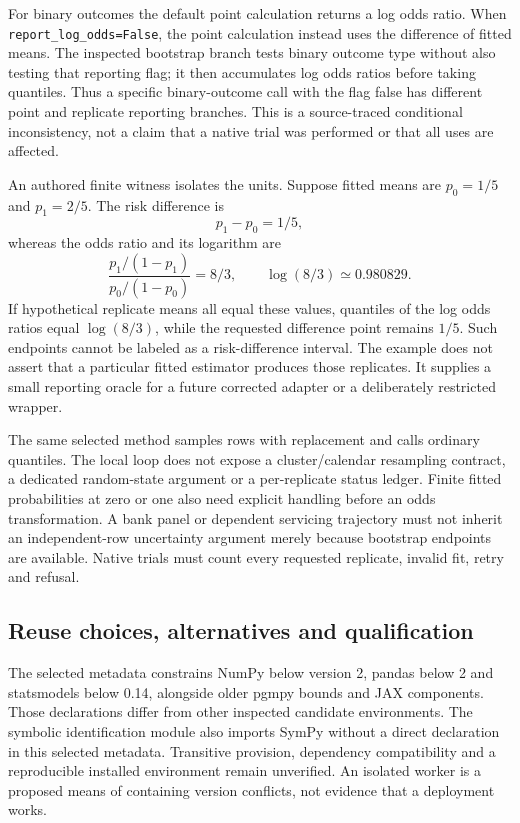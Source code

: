 For binary outcomes the default point calculation returns a log odds
ratio. When \texttt{report\_log\_odds=False}, the point calculation instead
uses the difference of fitted means. The inspected bootstrap branch tests
binary outcome type without also testing that reporting flag; it then
accumulates log odds ratios before taking quantiles. Thus a specific
binary-outcome call with the flag false has different point and replicate
reporting branches. This is a source-traced conditional inconsistency,
not a claim that a native trial was performed or that all uses are affected.
\citep{exec24_ananke_source}

An authored finite witness isolates the units. Suppose fitted means are
$p_0=1/5$ and $p_1=2/5$. The risk difference is
\[
 p_1-p_0=1/5,
\]
whereas the odds ratio and its logarithm are
\[
 \frac{p_1/(1-p_1)}{p_0/(1-p_0)}=8/3,
 \qquad \log(8/3)\simeq0.980829.
\]
If hypothetical replicate means all equal these values, quantiles of
the log odds ratios equal $\log(8/3)$, while the requested difference
point remains $1/5$. Such endpoints cannot be labeled as a risk-difference
interval. The example does not assert that a particular fitted estimator
produces those replicates. It supplies a small reporting oracle for a
future corrected adapter or a deliberately restricted wrapper.
\citep{exec24_ananke_choice}

The same selected method samples rows with replacement and calls ordinary
quantiles. The local loop does not expose a cluster/calendar resampling
contract, a dedicated random-state argument or a per-replicate status
ledger. Finite fitted probabilities at zero or one also need explicit
handling before an odds transformation. A bank panel or dependent servicing
trajectory must not inherit an independent-row uncertainty argument merely
because bootstrap endpoints are available. Native trials must count every
requested replicate, invalid fit, retry and refusal.
\citep{exec24_ananke_source,exec24_ananke_choice}

\subsection{Reuse choices, alternatives and qualification}
The selected metadata constrains NumPy below version 2, pandas below 2 and
statsmodels below 0.14, alongside older pgmpy bounds and JAX components.
Those declarations differ from other inspected candidate environments.
The symbolic identification module also imports SymPy without a direct
declaration in this selected metadata. Transitive provision, dependency
compatibility and a reproducible installed environment remain unverified.
An isolated worker is a proposed means of containing version conflicts,
not evidence that a deployment works.\citep{exec24_ananke_source}

